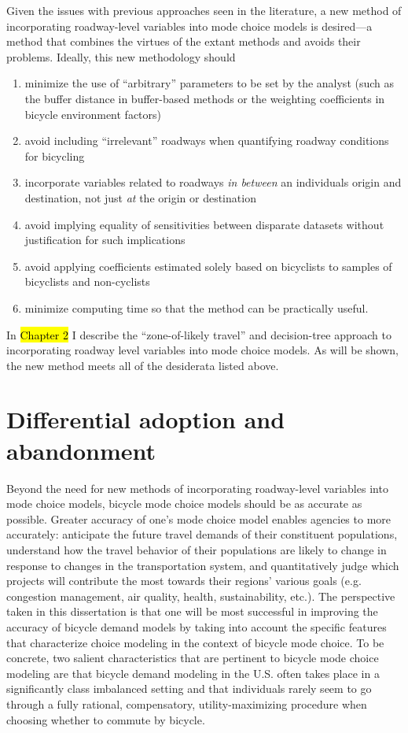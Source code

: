 \documentclass{article}
\begin{document}
Given the issues with previous approaches seen in the literature, a new method of incorporating roadway-level variables into mode choice models is desired---a method that combines the virtues of the extant methods and avoids their problems. Ideally, this new methodology should
\begin{enumerate}
\item minimize the use of ``arbitrary'' parameters to be set by the analyst (such as the buffer distance in buffer-based methods or the weighting coefficients in bicycle environment factors)
\item avoid including ``irrelevant'' roadways when quantifying roadway conditions for bicycling
\item incorporate variables related to roadways \textit{in between} an individuals origin and destination, not just \textit{at} the origin or destination
\item avoid implying equality of sensitivities between disparate datasets without justification for such implications
\item avoid applying coefficients estimated solely based on bicyclists to samples of bicyclists and non-cyclists
\item minimize computing time so that the method can be practically useful.
\end{enumerate}

In \hl{Chapter 2} I describe the ``zone-of-likely travel'' and decision-tree approach to incorporating roadway level variables into mode choice models. As will be shown, the new method meets all of the desiderata listed above.

\section{Differential adoption and abandonment}
\label{sec:asym-motivation}
Beyond the need for new methods of incorporating roadway-level variables into mode choice models, bicycle mode choice models should be as accurate as possible. Greater accuracy of one's mode choice model enables agencies to more accurately: anticipate the future travel demands of their constituent populations, understand how the travel behavior of their populations are likely to change in response to changes in the transportation system, and quantitatively judge which projects will contribute the most towards their regions' various goals (e.g. congestion management, air quality, health, sustainability, etc.). The perspective taken in this dissertation is that one will be most successful in improving the accuracy of bicycle demand models by taking into account the specific features that characterize choice modeling in the context of bicycle mode choice. To be concrete, two salient characteristics that are pertinent to bicycle mode choice modeling are that bicycle demand modeling in the U.S. often takes place in a significantly class imbalanced setting and that individuals rarely seem to go through a fully rational, compensatory, utility-maximizing procedure when choosing whether to commute by bicycle. 
\end{document}
